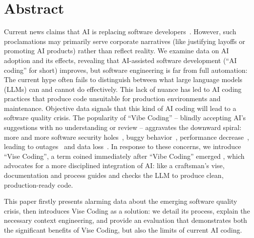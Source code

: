 \documentclass[twocolumn,german]{article}
\begin{document}
\setlength{\belowcaptionskip}{-10pt}

\section*{Abstract}
Current news claims that AI is replacing software developers~\cite{RJ25,KT25,ET25}.
However, such proclamations may primarily serve corporate narratives (like justifying layoffs or promoting AI products) rather than reflect reality.
We examine data on AI adoption and its effects, revealing that AI-assisted software development (``AI coding'' for short) improves,
but software engineering is far from full automation: 
The current hype often fails to distinguish between what large language models (LLMs) can and cannot do effectively.
This lack of nuance has led to AI coding practices that produce code unsuitable for production environments and maintenance.
Objective data signals that this kind of AI coding will lead to a software quality crisis.
The popularity of ``Vibe Coding'' -- blindly accepting AI's suggestions with no understanding or review -- aggravates the downward spiral:
more and more software security holes~\cite{HP25,CW25}, buggy behavior~\cite{Liu24}, performance decrease~\cite{SL24},
leading to outages~\cite{FJ24} and data loss~\cite{BN25}.
In response to these concerns, we introduce ``Vise Coding'', a term coined immediately after ``Vibe Coding'' emerged \cite{DF25},
which advocates for a more disciplined integration of AI:
like a craftsman's vise, documentation and process guides and checks the LLM to produce clean, production-ready code.

This paper firstly presents alarming data about the emerging software quality crisis,
then introduces Vise Coding as a solution: we detail its process, explain the necessary context engineering,
and provide an evaluation that demonstrates both the significant benefits of Vise Coding,
but also the limits of current AI coding.
\end{document}
